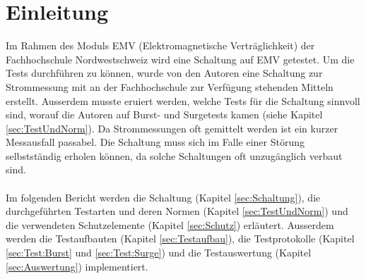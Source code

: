 \section{Einleitung}


Im Rahmen des Moduls EMV (Elektromagnetische Verträglichkeit) der Fachhochschule Nordwestschweiz wird eine Schaltung auf EMV getestet. Um die Tests durchführen zu können, wurde von den Autoren eine Schaltung zur Strommessung mit an der Fachhochschule zur Verfügung stehenden Mitteln erstellt. Ausserdem musste eruiert werden, welche Tests für die Schaltung sinnvoll sind, worauf die Autoren auf Burst- und Surgetests kamen (siehe Kapitel \ref{sec:TestUndNorm}). Da Strommessungen oft gemittelt werden ist ein kurzer Messausfall passabel. Die Schaltung muss sich im Falle einer Störung selbstständig erholen können, da solche Schaltungen oft unzugänglich verbaut sind. \\
\\
Im folgenden Bericht werden die Schaltung (Kapitel \ref{sec:Schaltung}), die durchgeführten Testarten und deren Normen (Kapitel \ref{sec:TestUndNorm}) und die verwendeten Schutzelemente (Kapitel \ref{sec:Schutz}) erläutert. Ausserdem werden die Testaufbauten (Kapitel \ref{sec:Testaufbau}), die Testprotokolle (Kapitel \ref{sec:Test:Burst} und \ref{sec:Test:Surge}) und die Testauswertung (Kapitel \ref{sec:Auswertung}) implementiert.